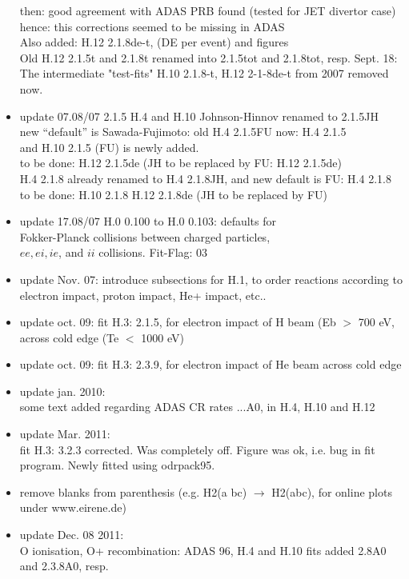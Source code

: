 \documentclass[12pt,dvipdfmx]{article}
\begin{document}
\begin{itemize}
  then: good agreement with ADAS PRB found (tested for JET divertor case)\\
  hence: this corrections seemed to be missing in ADAS\\
  Also added: H.12 2.1.8de-t, (DE per event) and figures \\
  Old H.12 2.1.5t and 2.1.8t renamed into 2.1.5tot and 2.1.8tot, resp.
  Sept. 18: The intermediate "test-fits" H.10 2.1.8-t, H.12 2-1-8de-t from 2007 removed now. 
  \item update   07.08/07  2.1.5 H.4 and H.10 Johnson-Hinnov renamed to 2.1.5JH\\
  new ``default'' is Sawada-Fujimoto: old H.4 2.1.5FU now: H.4 2.1.5\\
  and H.10 2.1.5  (FU) is newly added.\\
  to be done: H.12 2.1.5de  (JH to be replaced by FU: H.12 2.1.5de)\\
  H.4 2.1.8 already renamed to H.4 2.1.8JH, and new default is FU: H.4 2.1.8\\
  to be done: H.10 2.1.8 H.12 2.1.8de  (JH to be replaced by FU)
  \item update   17.08/07  H.0 0.100 to H.0 0.103: defaults for \\
  Fokker-Planck collisions between charged particles,\\
  $ee, ei, ie$, and $ii$ collisions. Fit-Flag: 03
  \item update Nov. 07:  introduce subsections for H.1, to order
  reactions according to electron impact, proton impact, He+ impact, etc..
  \item update oct. 09:  fit H.3: 2.1.5, for electron impact
  of H beam (Eb $>$ 700 eV, across cold edge (Te $<$ 1000 eV)
  \item update oct. 09:  fit H.3: 2.3.9, for electron impact
  of He beam across cold edge
  \item update jan. 2010: \\
  some text added regarding ADAS CR rates
  ...A0, in H.4, H.10 and H.12
  \item update Mar. 2011:  \\
  fit H.3: 3.2.3 corrected. Was completely off.
  Figure was ok, i.e. bug in fit program. Newly fitted using odrpack95.
  \item remove blanks from parenthesis (e.g. H2(a bc) $\rightarrow$ H2(abc), for online plots under www.eirene.de)
  \item update Dec. 08 2011:  \\
  O ionisation, O+ recombination: ADAS 96, H.4 and H.10 fits added 2.8A0 and 2.3.8A0, resp.

\end{itemize}
\end{document}

